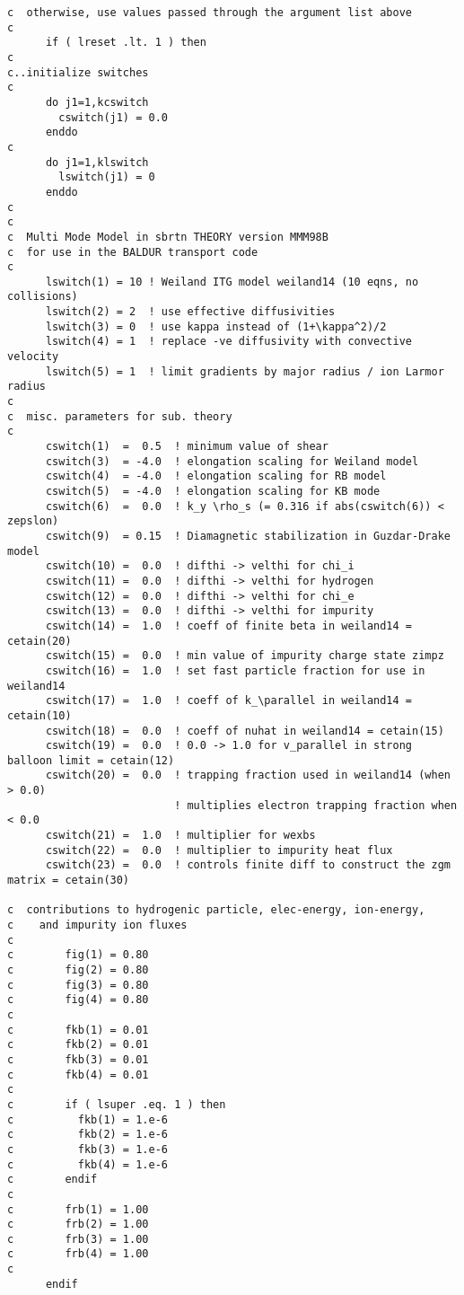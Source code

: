 \begin{verbatim}
c  otherwise, use values passed through the argument list above
c
      if ( lreset .lt. 1 ) then
c
c..initialize switches
c
      do j1=1,kcswitch
        cswitch(j1) = 0.0
      enddo
c
      do j1=1,klswitch
        lswitch(j1) = 0
      enddo
c
c
c  Multi Mode Model in sbrtn THEORY version MMM98B
c  for use in the BALDUR transport code
c
      lswitch(1) = 10 ! Weiland ITG model weiland14 (10 eqns, no collisions)
      lswitch(2) = 2  ! use effective diffusivities
      lswitch(3) = 0  ! use kappa instead of (1+\kappa^2)/2
      lswitch(4) = 1  ! replace -ve diffusivity with convective velocity
      lswitch(5) = 1  ! limit gradients by major radius / ion Larmor radius
c
c  misc. parameters for sub. theory
c
      cswitch(1)  =  0.5  ! minimum value of shear
      cswitch(3)  = -4.0  ! elongation scaling for Weiland model
      cswitch(4)  = -4.0  ! elongation scaling for RB model
      cswitch(5)  = -4.0  ! elongation scaling for KB mode
      cswitch(6)  =  0.0  ! k_y \rho_s (= 0.316 if abs(cswitch(6)) < zepslon)
      cswitch(9)  = 0.15  ! Diamagnetic stabilization in Guzdar-Drake model
      cswitch(10) =  0.0  ! difthi -> velthi for chi_i
      cswitch(11) =  0.0  ! difthi -> velthi for hydrogen
      cswitch(12) =  0.0  ! difthi -> velthi for chi_e
      cswitch(13) =  0.0  ! difthi -> velthi for impurity
      cswitch(14) =  1.0  ! coeff of finite beta in weiland14 = cetain(20)
      cswitch(15) =  0.0  ! min value of impurity charge state zimpz
      cswitch(16) =  1.0  ! set fast particle fraction for use in weiland14
      cswitch(17) =  1.0  ! coeff of k_\parallel in weiland14 = cetain(10)
      cswitch(18) =  0.0  ! coeff of nuhat in weiland14 = cetain(15)
      cswitch(19) =  0.0  ! 0.0 -> 1.0 for v_parallel in strong balloon limit = cetain(12)
      cswitch(20) =  0.0  ! trapping fraction used in weiland14 (when > 0.0)
                          ! multiplies electron trapping fraction when < 0.0
      cswitch(21) =  1.0  ! multiplier for wexbs 
      cswitch(22) =  0.0  ! multiplier to impurity heat flux
      cswitch(23) =  0.0  ! controls finite diff to construct the zgm matrix = cetain(30)

c  contributions to hydrogenic particle, elec-energy, ion-energy,
c    and impurity ion fluxes
c
c        fig(1) = 0.80
c        fig(2) = 0.80
c        fig(3) = 0.80
c        fig(4) = 0.80
c
c        fkb(1) = 0.01
c        fkb(2) = 0.01
c        fkb(3) = 0.01
c        fkb(4) = 0.01
c
c        if ( lsuper .eq. 1 ) then
c          fkb(1) = 1.e-6
c          fkb(2) = 1.e-6
c          fkb(3) = 1.e-6
c          fkb(4) = 1.e-6
c        endif
c
c        frb(1) = 1.00
c        frb(2) = 1.00
c        frb(3) = 1.00
c        frb(4) = 1.00
c
      endif

\end{verbatim}

